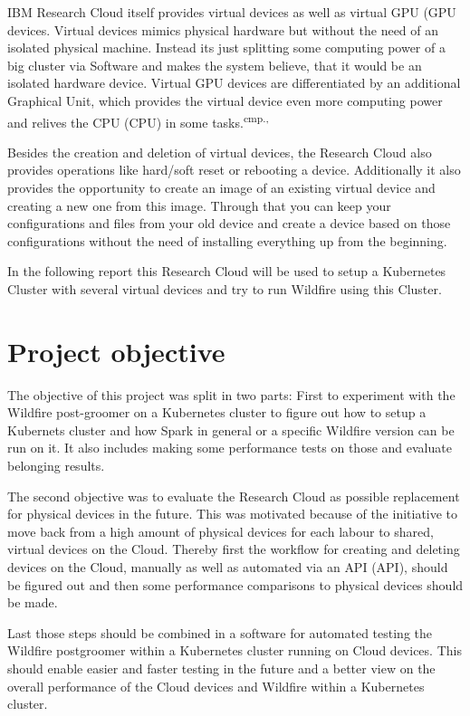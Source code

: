 
IBM Research Cloud itself provides virtual devices as well as virtual \acs{GPU} (\acl{GPU} devices. Virtual devices mimics physical hardware but without the need of an isolated physical machine. Instead its just splitting some computing power of a big cluster via Software and makes the system believe, that it would be an isolated hardware device. Virtual GPU devices are differentiated by an additional Graphical Unit, which provides the virtual device even more computing power and relives the \acs{CPU} (\acl{CPU}) in some tasks.\textsuperscript{cmp.\cite{10}, \cite{11}}


Besides the creation and deletion of virtual devices, the Research Cloud also provides operations like hard/soft reset or rebooting a device. Additionally it also provides the opportunity to create an image of an existing virtual device and creating a new one from this image. Through that you can keep your configurations and files from your old device and create a device based on those configurations without the need of installing everything up from the beginning.

In the following report this Research Cloud will be used to setup a Kubernetes Cluster with several virtual devices and try to run Wildfire using this Cluster.

\section{Project objective}

The objective of this project was split in two parts: First to experiment with the Wildfire post-groomer on a Kubernetes cluster to figure out how to setup a Kubernets cluster and how Spark in general or a specific Wildfire version can be run on it. It also includes making some performance tests on those and evaluate belonging results. 

The second objective was to evaluate the Research Cloud as possible replacement for physical devices in the future. This was motivated because of the initiative to move back from a high amount of physical devices for each labour to shared, virtual devices on the Cloud. Thereby first the workflow for creating and deleting devices on the Cloud, manually as well as automated via an \acs{API} (\acl{API}), should be figured out and then some performance comparisons to physical devices should be made.

Last those steps should be combined in a software for automated testing the Wildfire postgroomer within a Kubernetes cluster running on Cloud devices. This should enable easier and faster testing in the future and a better view on the overall performance of the Cloud devices and Wildfire within a Kubernetes cluster.
